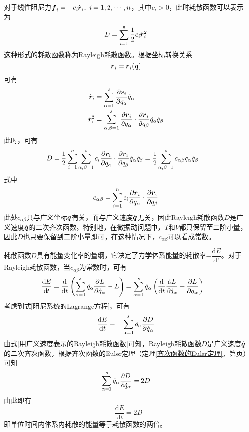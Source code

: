 对于线性阻尼力$\boldsymbol{f}_i = -c_i \dot{\boldsymbol{r}}_i,\,\,i=1,2,\cdots,n$，其中$c_i > 0$，此时耗散函数可以表示为
\begin{equation*}
	D = \sum_{i=1}^n \frac12 c_i \dot{\mbf{r}}_i^2 %
\end{equation*}
这种形式的耗散函数称为{\heiti Rayleigh耗散函数}。根据坐标转换关系
\begin{equation*}
	\boldsymbol{r}_i = \boldsymbol{r}_i(\boldsymbol{q})
\end{equation*}
可有
\begin{align*}
	\dot{\boldsymbol{r}}_i & = \sum_{\alpha=1}^s \frac{\partial \boldsymbol{r}_i}{\partial q_\alpha} \dot{q}_\alpha \\
	\dot{\boldsymbol{r}}_i^2 & = \sum_{\alpha,\beta=1}^s \frac{\partial \boldsymbol{r}_i}{\partial q_\alpha} \cdot \frac{\partial \boldsymbol{r}_i}{\partial q_\beta} \dot{q}_\alpha \dot{q}_\beta
\end{align*}
此时，可有
\begin{align}
	D & = \frac12 \sum_{i=1}^n \sum_{\alpha,\beta=1}^s c_i \frac{\partial \boldsymbol{r}_i}{\partial q_\alpha} \cdot \frac{\partial \boldsymbol{r}_i}{\partial q_\beta} \dot{q}_\alpha \dot{q}_\beta = \frac12 \sum_{\alpha,\beta=1}^s c_{\alpha\beta} \dot{q}_\alpha \dot{q}_\beta
	\label{用广义速度表示的Rayleigh耗散函数}
\end{align}
式中
\begin{equation*}
	c_{\alpha\beta} = \sum_{i=1}^n c_i \frac{\partial \boldsymbol{r}_i}{\partial q_\alpha} \cdot \frac{\partial \boldsymbol{r}_i}{\partial q_\beta}
\end{equation*}
此处$c_{\alpha\beta}$只与广义坐标$\boldsymbol{q}$有关，而与广义速度$\dot{\boldsymbol{q}}$无关，因此Rayleigh耗散函数$D$是广义速度$\dot{\boldsymbol{q}}$的二次齐次函数。特别地，在微振动问题中，$T$和$V$都只保留至二阶小量，因此$D$也只要保留到二阶小量即可，在这种情况下，$c_{\alpha\beta}$可以看成常数。

耗散函数$D$具有能量变化率的量纲，它决定了力学体系能量的耗散率$-\dfrac{\mathrm{d}E}{\mathrm{d}t}$。对于Rayleigh耗散函数，当$c_{\alpha\beta}$为常数时，可有
\begin{align*}
	\frac{\mathrm{d} E}{\mathrm{d} t} & = \frac{\mathrm{d}}{\mathrm{d} t} \left(\sum_{\alpha=1}^s \dot{q}_\alpha \frac{\partial L}{\partial \dot{q}_\alpha} - L\right) = \sum_{\alpha=1}^s \dot{q}_\alpha \left(\frac{\mathrm{d}}{\mathrm{d} t} \frac{\partial L}{\partial \dot{q}_\alpha} - \frac{\partial L}{\partial q_\alpha}\right)
\end{align*}
考虑到式\eqref{阻尼系统的Lagrange方程}，可有
\begin{equation*}
	\frac{\mathrm{d} E}{\mathrm{d} t} = -\sum_{\alpha=1}^s \dot{q}_\alpha \frac{\partial D}{\partial \dot{q}_\alpha}
\end{equation*}
由式\eqref{用广义速度表示的Rayleigh耗散函数}可知，Rayleigh耗散函数$D$是广义速度$\dot{\boldsymbol{q}}$的二次齐次函数，根据齐次函数的Euler定理（定理\ref{齐次函数的Euler定理}，第\pageref{齐次函数的Euler定理}页）可知
\begin{equation*}
	\sum_{\alpha=1}^s \dot{q}_\alpha \frac{\partial D}{\partial \dot{q}_\alpha} = 2D
\end{equation*}
由此即有
\begin{equation}
	-\frac{\mathrm{d} E}{\mathrm{d} t} = 2D
\end{equation}
即单位时间内体系内耗散的能量等于耗散函数的两倍。
